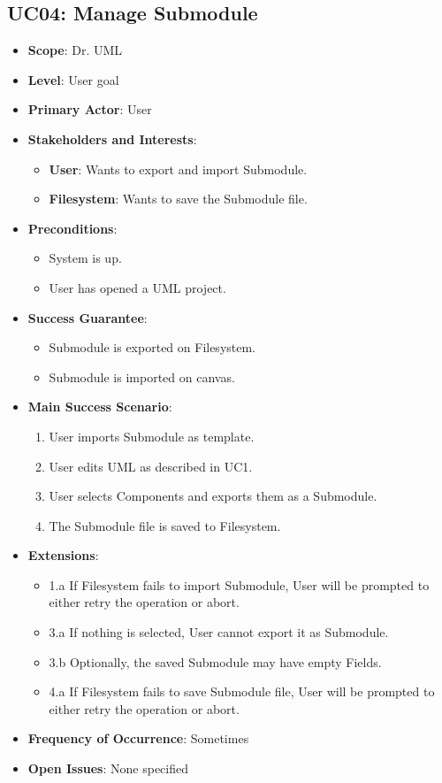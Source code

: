 \documentclass[12pt]{article}
\begin{document}
\subsection{UC04: Manage Submodule}
\begin{itemize}
    \item \textbf{Scope}: Dr. UML
    \item \textbf{Level}: User goal
    \item \textbf{Primary Actor}: User
    \item \textbf{Stakeholders and Interests}:
    \begin{itemize}
        \item \textbf{User}: Wants to export and import Submodule.
        \item \textbf{Filesystem}: Wants to save the Submodule file.
    \end{itemize}
    \item \textbf{Preconditions}:
    \begin{itemize}
        \item System is up.
        \item User has opened a UML project.
    \end{itemize}
    \item \textbf{Success Guarantee}: 
    \begin{itemize}
        \item Submodule is exported on Filesystem.
        \item Submodule is imported on canvas.
    \end{itemize}
    \item \textbf{Main Success Scenario}:
    \begin{enumerate}
        \item User imports Submodule as template.
        \item User edits UML as described in UC1.
        \item User selects Components and exports them as a Submodule.
        \item The Submodule file is saved to Filesystem.
    \end{enumerate}
    \item \textbf{Extensions}:
    \begin{itemize}
        \item 1.a If Filesystem fails to import Submodule, User will be prompted to either retry the operation or abort.
        \item 3.a If nothing is selected, User cannot export it as Submodule.
        \item 3.b Optionally, the saved Submodule may have empty Fields.
        \item 4.a If Filesystem fails to save Submodule file, User will be prompted to either retry the operation or abort.
    \end{itemize}
    \item \textbf{Frequency of Occurrence}: Sometimes
    \item \textbf{Open Issues}: None specified
\end{itemize}
\end{document}

